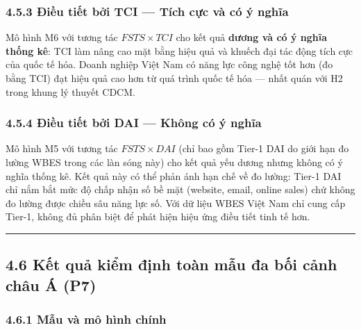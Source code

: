 \documentclass[12pt,a4paper]{article}
\begin{document}
\hypertarget{453-ux111iux1ec1u-tiux1ebft-bux1edfi-tci--tuxedch-cux1ef1c-vuxe0-cuxf3-uxfd-nghux129a}{%
\subsubsection{4.5.3 Điều tiết bởi TCI --- Tích cực và có ý
nghĩa}\label{453-ux111iux1ec1u-tiux1ebft-bux1edfi-tci--tuxedch-cux1ef1c-vuxe0-cuxf3-uxfd-nghux129a}}

Mô hình M6 với tương tác \(FSTS \times TCI\) cho kết quả \textbf{dương
và có ý nghĩa thống kê}: TCI làm nâng cao mặt bằng hiệu quả và khuếch
đại tác động tích cực của quốc tế hóa. Doanh nghiệp Việt Nam có năng lực
công nghệ tốt hơn (đo bằng TCI) đạt hiệu quả cao hơn từ quá trình quốc
tế hóa --- nhất quán với H2 trong khung lý thuyết CDCM.

\hypertarget{454-ux111iux1ec1u-tiux1ebft-bux1edfi-dai--khuxf4ng-cuxf3-uxfd-nghux129a}{%
\subsubsection{4.5.4 Điều tiết bởi DAI --- Không có ý
nghĩa}\label{454-ux111iux1ec1u-tiux1ebft-bux1edfi-dai--khuxf4ng-cuxf3-uxfd-nghux129a}}

Mô hình M5 với tương tác \(FSTS \times DAI\) (chỉ bao gồm Tier-1 DAI do
giới hạn đo lường WBES trong các làn sóng này) cho kết quả yếu dương
nhưng không có ý nghĩa thống kê. Kết quả này có thể phản ánh hạn chế về
đo lường: Tier-1 DAI chỉ nắm bắt mức độ chấp nhận số bề mặt (website,
email, online sales) chứ không đo lường được chiều sâu năng lực số. Với
dữ liệu WBES Việt Nam chỉ cung cấp Tier-1, không đủ phân biệt để phát
hiện hiệu ứng điều tiết tinh tế hơn.

\begin{center}\rule{0.5\linewidth}{0.5pt}\end{center}

\hypertarget{46-kux1ebft-quux1ea3-kiux1ec3m-ux111ux1ecbnh-touxe0n-mux1eabu-ux111a-bux1ed1i-cux1ea3nh-chuxe2u-uxe1-p7}{%
\subsection{4.6 Kết quả kiểm định toàn mẫu đa bối cảnh châu Á
(P7)}\label{46-kux1ebft-quux1ea3-kiux1ec3m-ux111ux1ecbnh-touxe0n-mux1eabu-ux111a-bux1ed1i-cux1ea3nh-chuxe2u-uxe1-p7}}

\hypertarget{461-mux1eabu-vuxe0-muxf4-huxecnh-chuxednh}{%
\subsubsection{4.6.1 Mẫu và mô hình
chính}\label{461-mux1eabu-vuxe0-muxf4-huxecnh-chuxednh}}
\end{document}

